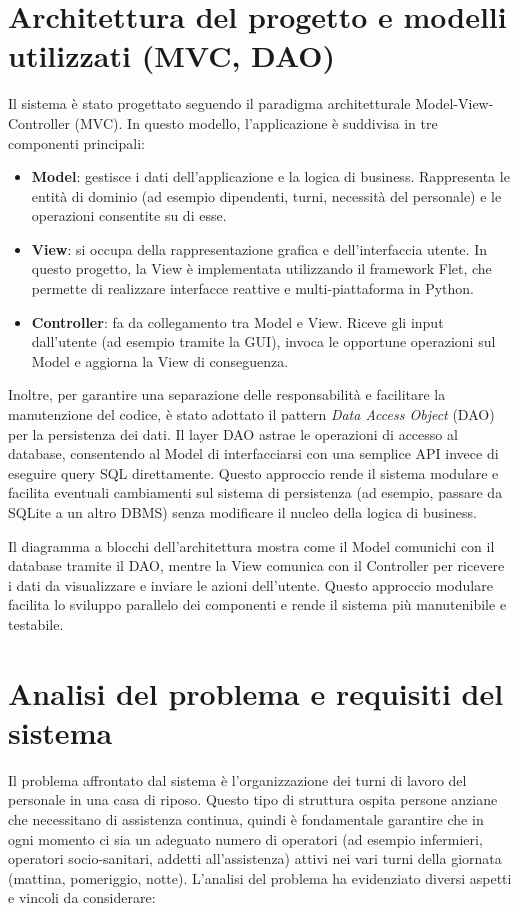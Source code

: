 \documentclass[a4paper,12pt]{report}
\begin{document}
\chapter{Architettura del progetto e modelli utilizzati (MVC, DAO)}
\label{cap:architettura}
Il sistema \`e stato progettato seguendo il paradigma architetturale Model-View-Controller (MVC). In questo modello, l'applicazione \`e suddivisa in tre componenti principali:
\begin{itemize}
    \item \textbf{Model}: gestisce i dati dell'applicazione e la logica di business. Rappresenta le entit\`a di dominio (ad esempio dipendenti, turni, necessit\`a del personale) e le operazioni consentite su di esse.
    \item \textbf{View}: si occupa della rappresentazione grafica e dell'interfaccia utente. In questo progetto, la View \`e implementata utilizzando il framework Flet, che permette di realizzare interfacce reattive e multi-piattaforma in Python.
    \item \textbf{Controller}: fa da collegamento tra Model e View. Riceve gli input dall'utente (ad esempio tramite la GUI), invoca le opportune operazioni sul Model e aggiorna la View di conseguenza.
\end{itemize}

Inoltre, per garantire una separazione delle responsabilit\`a e facilitare la manutenzione del codice, \`e stato adottato il pattern \emph{Data Access Object} (DAO) per la persistenza dei dati. Il layer DAO astrae le operazioni di accesso al database, consentendo al Model di interfacciarsi con una semplice API invece di eseguire query SQL direttamente. Questo approccio rende il sistema modulare e facilita eventuali cambiamenti sul sistema di persistenza (ad esempio, passare da SQLite a un altro DBMS) senza modificare il nucleo della logica di business.

Il diagramma a blocchi dell'architettura mostra come il Model comunichi con il database tramite il DAO, mentre la View comunica con il Controller per ricevere i dati da visualizzare e inviare le azioni dell'utente. Questo approccio modulare facilita lo sviluppo parallelo dei componenti e rende il sistema pi\`u manutenibile e testabile.

\chapter{Analisi del problema e requisiti del sistema}
\label{cap:analisi}
Il problema affrontato dal sistema \`e l'organizzazione dei turni di lavoro del personale in una casa di riposo. Questo tipo di struttura ospita persone anziane che necessitano di assistenza continua, quindi \`e fondamentale garantire che in ogni momento ci sia un adeguato numero di operatori (ad esempio infermieri, operatori socio-sanitari, addetti all'assistenza) attivi nei vari turni della giornata (mattina, pomeriggio, notte). L'analisi del problema ha evidenziato diversi aspetti e vincoli da considerare:
\end{document}
